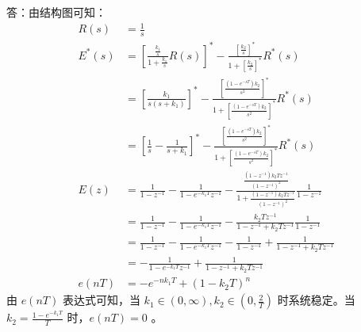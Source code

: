 {\onlyanswer
{
	答：由结构图可知：
	\begin{align*}
	R(s) &= \frac{1}{s} \\
	E^*(s) &= \left[\frac{\frac{k_1}{s}}{1+\frac{k_1}{s}}R(s)\right]^*-\frac{[\frac{k_2}{s}]^*}{1+[\frac{k_2}{s}]^*}R^*(s) \\
	&= \left[\frac{k_1}{s(s+k_1)}\right]^* -\frac{[\frac{(1-e^{-sT})k_2}{s^2}]^*}{1+[\frac{(1-e^{-sT})k_2}{s^2}]^*}R^*(s) \\
	&= \left[\frac{1}{s}-\frac{1}{s+k_1}\right]^* -\frac{[\frac{(1-e^{-sT})k_2}{s^2}]^*}{1+[\frac{(1-e^{-sT})k_2}{s^2}]^*}R^*(s) \\
	E(z)  &=\frac{1}{1-z^{-1}}-\frac{1}{1-e^{-k_1T}z^{-1}}-\frac{\frac{(1-z^{-1})k_2Tz^{-1}}{(1-z^{-1})^2}}{1+\frac{(1-z^{-1})k_2Tz^{-1}}{(1-z^{-1})^2}}\frac{1}{1-z^{-1}} \\
	&=\frac{1}{1-z^{-1}}-\frac{1}{1-e^{-k_1T}z^{-1}}-\frac{k_2Tz^{-1}}{1-z^{-1}+k_2 T z^{-1}}\frac{1}{1-z^{-1}} \\
	&=\frac{1}{1-z^{-1}}-\frac{1}{1-e^{-k_1T}z^{-1}}-\frac{1}{1-z^{-1}}+\frac{1}{1-z^{-1}+k_2Tz^{-1}} \\
	&=-\frac{1}{1-e^{-k_1T}z^{-1}}+\frac{1}{1-z^{-1}+k_2Tz^{-1}} \\
	e(nT) &=-e^{-nk_1T}+(1-k_2T)^n
	\end{align*}
	由 $e(nT)$ 表达式可知，当 $k_1\in(0,\infty),k_2\in(0,\frac{2}{T})$ 时系统稳定。当 $k_2=\frac{1-e^{-k_1T}}{T}$ 时，$e(nT)=0$ 。
}

}

